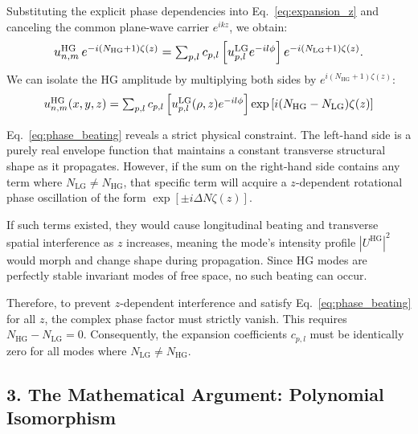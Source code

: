 \begin{resolucao}[Solution]
        Substituting the explicit phase dependencies into Eq.~\eqref{eq:expansion_z} and canceling the common plane-wave carrier $e^{ikz}$, we obtain:
        \begin{equation}
            \resizebox{0.8\columnwidth}{!}{%
            $u_{n,m}^{\text{HG}} \, e^{-i(N_{\text{HG}} + 1)\zeta(z)} = \sum_{p,l} c_{p,l} \left[ u_{p,l}^{\text{LG}} e^{-il\phi} \right] e^{-i(N_{\text{LG}} + 1)\zeta(z)}.$%
            }
            \label{eq:phase_beating}
        \end{equation}
        We can isolate the HG amplitude by multiplying both sides by $e^{i(N_{\text{HG}} + 1)\zeta(z)}$:
        \begin{equation}
            \resizebox{0.85\columnwidth}{!}{%
            $u_{n,m}^{\text{HG}}(x,y,z) = \sum_{p,l} c_{p,l} \left[ u_{p,l}^{\text{LG}}(\rho,z) e^{-il\phi} \right] \exp\left[ i (N_{\text{HG}} - N_{\text{LG}}) \zeta(z) \right]$%
            }
            \label{eq:phase_beating}
        \end{equation}
    
        Eq.~\eqref{eq:phase_beating} reveals a strict physical constraint. The left-hand side is a purely real envelope function that maintains a constant transverse structural shape as it propagates. However, if the sum on the right-hand side contains any term where $N_{\text{LG}} \neq N_{\text{HG}}$, that specific term will acquire a $z$-dependent rotational phase oscillation of the form $\exp[\pm i \Delta N \zeta(z)]$. 
        
        If such terms existed, they would cause longitudinal beating and transverse spatial interference as $z$ increases, meaning the mode's intensity profile $|U^{\text{HG}}|^2$ would morph and change shape during propagation. Since HG modes are perfectly stable invariant modes of free space, no such beating can occur. 
        
        Therefore, to prevent $z$-dependent interference and satisfy Eq.~\eqref{eq:phase_beating} for all $z$, the complex phase factor must strictly vanish. This requires $N_{\text{HG}} - N_{\text{LG}} = 0$. Consequently, the expansion coefficients $c_{p,l}$ must be identically zero for all modes where $N_{\text{LG}} \neq N_{\text{HG}}$.

    \subsection*{3. The Mathematical Argument: Polynomial Isomorphism}


\end{resolucao}
